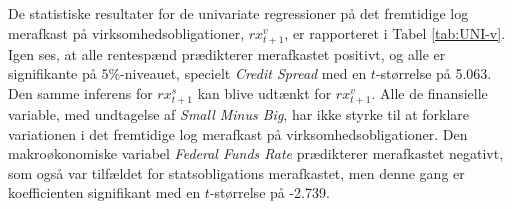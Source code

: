 \documentclass[
  a4paper,
  oneside]{memoir}
\begin{document}
De statistiske resultater for de univariate regressioner på det fremtidige log merafkast på virksomhedsobligationer, \(rx_{t+1}^v\), er rapporteret i Tabel \ref{tab:UNI-v}. Igen ses, at alle rentespænd prædikterer merafkastet positivt, og alle er signifikante på \(5\%\)-niveauet, specielt \emph{Credit Spread} med en \(t\)-størrelse på 5.063. Den samme inferens for \(rx_{t+1}^s\) kan blive udtænkt for \(rx_{t+1}^v\). Alle de finansielle variable, med undtagelse af \emph{Small Minus Big}, har ikke styrke til at forklare variationen i det fremtidige log merafkast på virksomhedsobligationer. Den makroøkonomiske variabel \emph{Federal Funds Rate} prædikterer merafkastet negativt, som også var tilfældet for statsobligations merafkastet, men denne gang er koefficienten signifikant med en \(t\)-størrelse på -2.739.

\begin{table}[H]


\end{table}
\end{document}
